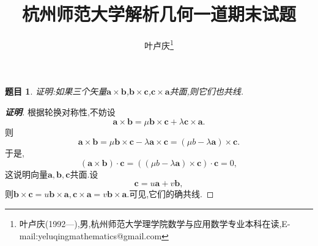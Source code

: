 \documentclass[a4paper]{article}
\newtheorem*{exe}{题目}
\newenvironment{exercise}
{\bigskip\begin{mdframed}\begin{exe}}
    {\end{exe}\end{mdframed}\bigskip}
\begin{document}
\title{\huge{\bf{杭州师范大学解析几何一道期末试题}}} \author{\small{叶卢庆\footnote{叶卢庆(1992---),男,杭州师范大学理学院数学与应用数学专业本科在读,E-mail:yeluqingmathematics@gmail.com}}}
\maketitle
\begin{exercise}
  证明:如果三个矢量$\mathbf{a}\times \mathbf{b}$,$\mathbf{b}\times
  \mathbf{c}$,$\mathbf{c}\times \mathbf{a}$共面,则它们也共线.
\end{exercise}
\begin{proof}[\textbf{证明}]
根据轮换对称性,不妨设
$$
\mathbf{a}\times \mathbf{b}=\mu \mathbf{b}\times \mathbf{c}+\lambda
\mathbf{c}\times \mathbf{a}.
$$
则
$$
\mathbf{a}\times \mathbf{b}=\mu \mathbf{b}\times \mathbf{c}-\lambda
\mathbf{a}\times \mathbf{c}=(\mu b-\lambda \mathbf{a})\times \mathbf{c}.
$$
于是,
$$
(\mathbf{a}\times \mathbf{b})\cdot \mathbf{c}=((\mu b-\lambda
\mathbf{a})\times \mathbf{c})\cdot \mathbf{c}=0,
$$
这说明向量$\mathbf{a},\mathbf{b},\mathbf{c}$共面.设
$$
\mathbf{c}=u \mathbf{a}+v\mathbf{b},
$$
则$\mathbf{b}\times \mathbf{c}=u \mathbf{b}\times
\mathbf{a},\mathbf{c}\times \mathbf{a}=v \mathbf{b}\times
\mathbf{a}$.可见,它们的确共线.
\end{proof}
\end{document}
